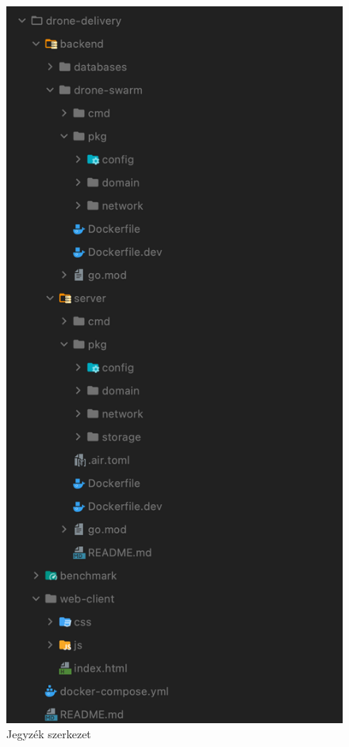 \begin{figure}[h]
    \centering
    \includegraphics[scale=0.5]{images/szerkezet}
    \caption{Jegyzék szerkezet}
    \label{fig:szerkezet}
\end{figure}

